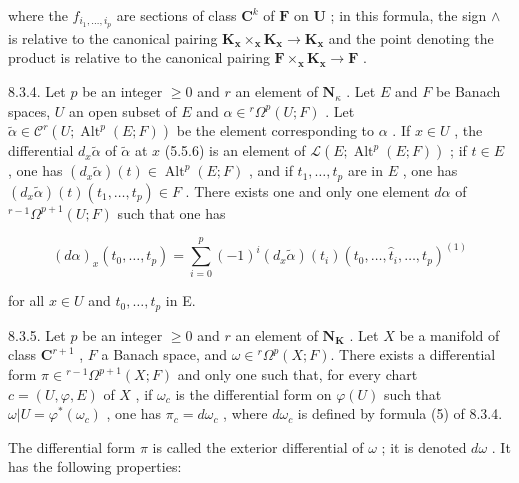 where the \(f_{i_1,\ldots,i_p}\) are sections of class \(\mathbf{C}^k\) of \(\mathbf{F}\) on \(\mathbf{U}\) ; in this formula, the sign \(\wedge\) is relative to the canonical pairing \(\mathbf{K}_{\mathbf{x}} \times_{\mathbf{x}} \mathbf{K}_{\mathbf{x}} \to \mathbf{K}_{\mathbf{x}}\) and the point denoting the product is relative to the canonical pairing \(\mathbf{F} \times_{\mathbf{x}} \mathbf{K}_{\mathbf{x}} \to \mathbf{F}\) .

8.3.4. Let \(p\) be an integer \(\geqslant 0\) and \(r\) an element of \(\mathbf{N}_{\kappa}\) . Let \(E\) and \(F\) be Banach spaces, \(U\) an open subset of \(E\) and \(\alpha \in {}^r\Omega^p(U;F)\) . Let \(\tilde{\alpha} \in \mathcal{C}^r (U; \operatorname{Alt}^p(E;F))\) be the element corresponding to \(\alpha\) . If \(x \in U\) , the differential \(d_x\tilde{\alpha}\) of \(\tilde{\alpha}\) at \(x\) (5.5.6) is an element of \(\mathcal{L}(E; \operatorname{Alt}^p(E;F))\) ; if \(t \in E\) , one has \((d_x\tilde{\alpha})(t) \in \operatorname{Alt}^p(E;F)\) , and if \(t_1, \ldots, t_p\) are in \(E\) , one has \((d_x\tilde{\alpha})(t)(t_1, \ldots, t_p) \in F\) . There exists one and only one element \(d\alpha\) of \({}^{r-1}\Omega^{p+1}(U;F)\) such that one has

\[
(d \alpha) _ {x} (t _ {0}, \dots , t _ {p}) = \sum_ {i = 0} ^ {p} (- 1) ^ {i} (d _ {x} \tilde {\alpha}) (t _ {i}) (t _ {0}, \dots , \hat {t} _ {i}, \dots , t _ {p}) ^ {(1)}\tag{5}
\]

for all \(x \in U\) and \(t_{0}, \ldots, t_{p}\) in E.

8.3.5. Let \(p\) be an integer \(\geqslant 0\) and \(r\) an element of \(\mathbf{N}_{\mathbf{K}}\) . Let \(X\) be a manifold of class \(\mathbf{C}^{r+1}\) , \(F\) a Banach space, and \(\omega \in {}^r\Omega^p(X;F)\). There exists a differential form \(\pi \in {}^{r-1}\Omega^{p+1}(X;F)\) and only one such that, for every chart \(c = (U,\varphi,E)\) of \(X\) , if \(\omega_c\) is the differential form on \(\varphi(U)\) such that \(\omega|U = \varphi^*(\omega_c)\) , one has \(\pi_c = d\omega_c\) , where \(d\omega_c\) is defined by formula (5) of 8.3.4.

The differential form \(\pi\) is called the exterior differential of \(\omega\) ; it is denoted \(d\omega\) . It has the following properties:


